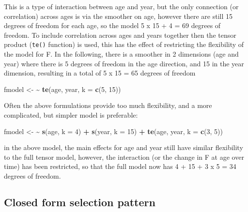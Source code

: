 \documentclass[
]{book}
\newenvironment{Shaded}{\begin{snugshade}}{\end{snugshade}}
\newcommand{\AttributeTok}[1]{\textcolor[rgb]{0.13,0.29,0.53}{#1}}
\newcommand{\DecValTok}[1]{\textcolor[rgb]{0.00,0.00,0.81}{#1}}
\newcommand{\ErrorTok}[1]{\textcolor[rgb]{0.64,0.00,0.00}{\textbf{#1}}}
\newcommand{\FunctionTok}[1]{\textcolor[rgb]{0.13,0.29,0.53}{\textbf{#1}}}
\newcommand{\NormalTok}[1]{#1}
\newcommand{\OtherTok}[1]{\textcolor[rgb]{0.56,0.35,0.01}{#1}}
\newcommand{\SpecialCharTok}[1]{\textcolor[rgb]{0.81,0.36,0.00}{\textbf{#1}}}
\begin{document}
This is a type of interaction between age and year, but the only connection (or correlation) across ages is via the smoother on age, however there are still 15 degrees of freedom for each age, so the model 5 x 15 + 4 = 69 degrees of freedom. To include correlation across ages and years together then the tensor product (\texttt{te()} function) is used, this has the effect of restricting the flexibility of the model for F. In the following, there is a smoother in 2 dimensions (age and year) where there is 5 degrees of freedom in the age direction, and 15 in the year dimension, resulting in a total of 5 x 15 = 65 degrees of freedom

\begin{Shaded}
\begin{Highlighting}[]
\NormalTok{fmodel }\OtherTok{\textless{}{-}} \ErrorTok{\textasciitilde{}} \FunctionTok{te}\NormalTok{(age, year, }\AttributeTok{k =} \FunctionTok{c}\NormalTok{(}\DecValTok{5}\NormalTok{, }\DecValTok{15}\NormalTok{))}
\end{Highlighting}
\end{Shaded}

Often the above formulations provide too much flexibility, and a more complicated, but simpler model is preferable:

\begin{Shaded}
\begin{Highlighting}[]
\NormalTok{fmodel }\OtherTok{\textless{}{-}} \ErrorTok{\textasciitilde{}} \FunctionTok{s}\NormalTok{(age, }\AttributeTok{k =} \DecValTok{4}\NormalTok{) }\SpecialCharTok{+} \FunctionTok{s}\NormalTok{(year, }\AttributeTok{k =} \DecValTok{15}\NormalTok{) }\SpecialCharTok{+} \FunctionTok{te}\NormalTok{(age, year, }\AttributeTok{k =} \FunctionTok{c}\NormalTok{(}\DecValTok{3}\NormalTok{, }\DecValTok{5}\NormalTok{))}
\end{Highlighting}
\end{Shaded}

in the above model, the main effects for age and year still have similar flexibility to the full tensor model, however, the interaction (or the change in F at age over time) has been restricted, so that the full model now has 4 + 15 + 3 x 5 = 34 degrees of freedom.

\hypertarget{closed-form-selection-pattern}{%
\subsection{Closed form selection pattern}\label{closed-form-selection-pattern}}
\end{document}
